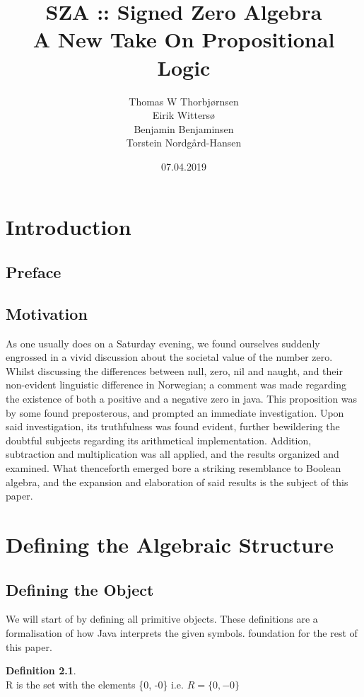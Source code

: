 \documentclass[12pt]{report}
\title{\Huge SZA :: Signed Zero Algebra \\
       \Large A New Take On Propositional Logic}
\author{{Thomas W Thorbjørnsen} \\
        {Eirik Wittersø}\\
        {Benjamin Benjaminsen}\\
        {Torstein Nordgård-Hansen}}
\date{07.04.2019}
\theoremstyle{definition}
\newtheorem{definition}{Definition}[section]
\theoremstyle{remark}
\begin{document}
\maketitle
\large
\tableofcontents
\newpage

\normalsize
\chapter{Introduction}
  \section{Preface}
  \section{Motivation}
    As one usually does on a Saturday evening,
    we found ourselves suddenly engrossed in a vivid discussion
    about the societal value of the number zero.
    Whilst discussing the differences between null, zero, nil and naught,
    and their non-evident linguistic difference in Norwegian;
    a comment was made regarding the existence of both a positive and a negative zero in java.
    This proposition was by some found preposterous, and prompted an immediate investigation.
    Upon said investigation, its truthfulness was found evident, further bewildering the doubtful subjects
    regarding its arithmetical implementation.
    Addition, subtraction and multiplication was all applied, and the results organized and examined.
    What thenceforth emerged bore a striking resemblance to Boolean algebra,
    and the expansion and elaboration of said results is the subject of this paper.

\chapter{Defining the Algebraic Structure}
  \section{Defining the Object}
    We will start of by defining all primitive objects. These definitions are a
    formalisation of how Java interprets the given symbols. foundation for the rest of this paper. \\

    \begin{definition}$\ $\\
    R is the set with the elements \{0, -0\} i.e. $R=\{0,-0\}$
    \end{definition}
\end{document}
